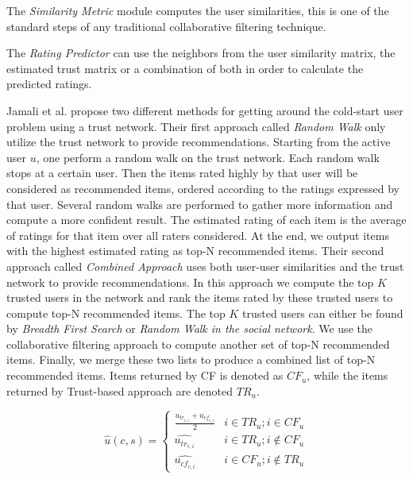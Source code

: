 The \emph{Similarity Metric} module computes the user similarities, this is one
of the standard steps of any traditional collaborative filtering technique.

The \emph{Rating Predictor} can use the neighbors from the user similarity
matrix, the estimated trust matrix or a combination of both in order to
calculate the predicted ratings.

Jamali et al. \cite{Jamali2009} propose two different methods for getting
around the cold-start user problem using a trust network. Their first approach
called \emph{Random Walk} only utilize the trust network to provide
recommendations. Starting from the active user $u$, one perform a random walk on
the trust network. Each random walk stops at a certain user. Then the items
rated highly by that user will be considered as recommended items, ordered
according to the ratings expressed by that user. Several random walks are
performed to gather more information and compute a more confident result. The
estimated rating of each item is the average of ratings for that item over all
raters considered. At the end, we output items with the highest estimated
rating as top-N recommended items. Their second approach called \emph{Combined
Approach} uses both user-user similarities and the trust network to provide
recommendations. In this approach we compute the top $K$ trusted users in the
network and rank the items rated by these trusted users to compute top-N
recommended items. The top $K$ trusted users can either be found by
\emph{Breadth First Search} or \emph{Random Walk in the social network}. We use
the collaborative filtering approach to compute another set of top-N
recommended items. Finally, we merge these two lists to produce a combined list
of top-N recommended items. Items returned by CF is denoted as $CF_{u}$, while
the items returned by Trust-based approach are denoted $TR_{u}$.

\begin{equation}
 \hat{u}(c,s) =
  \begin{cases}
   \frac{u_{tr_{c,i}}+u_{cf_{c,i}}}{2}     & i \in TR_{u};i \in CF_{u}         \\
   \hat{u_{tr_{c,i}}}                      & i \in TR_{u};i \not \in CF_{u}    \\
   \hat{u_{cf_{c,i}}}                      & i \in CF_{u};i \not \in TR_{u}     \end{cases}
\end{equation}

